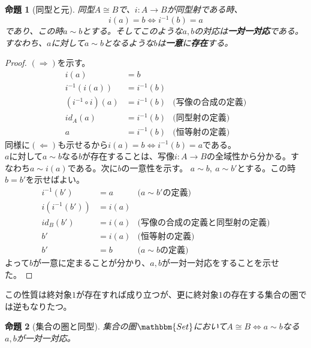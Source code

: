 \documentclass[uplatex,dvipdfmx]{jsarticle}
\newcommand{\cat}[1]{\mathbbm{#1}}
\newcommand{\arrow}{\rightarrow}
\newcommand{\mor}[3]{#1:#2\arrow #3}
\newtheorem{proof}{証明}[section]
\newtheorem{prop}[proof]{命題}
\numberwithin{proof}{subsection}
\begin{document}
  \begin{prop}[同型と元]
    同型$A\cong B$で、$\mor{i}{A}{B}$が同型射である時、
    \[i(a)=b\iff i^{-1}(b)=a\]であり、この時$a\sim b$とする。そしてこのような$a,b$の対応は\textbf{一対一対応}である。\\
    すなわち、$a$に対して$a\sim b$となるような$b$は\textbf{一意}に\textbf{存在}する。
    \begin{center}
    \end{center} 
  \end{prop}
  \begin{proof}
    $(\Longrightarrow)$を示す。
    \begin{align*}
      i(a)&=b\\
      i^{-1}(i(a))&=i^{-1}(b)\\
      (i^{-1}\circ i)(a)&=i^{-1}(b)&\text{(写像の合成の定義)}\\
      id_A(a)&=i^{-1}(b)&\text{(同型射の定義)}\\
      a &=i^{-1}(b)&\text{(恒等射の定義)}
    \end{align*}
    同様に$(\Longleftarrow)$も示せるから$i(a)=b\iff i^{-1}(b)=a$である。\\
    $a$に対して$a\sim b$なる$b$が存在することは、写像$\mor{i}{A}{B}$の全域性から分かる。すなわち$a\sim i(a)$である。次に$b$の一意性を示す。
    $a\sim b,\ a\sim b'$とする。この時$b=b'$を示せばよい。
    \begin{align*}
      i^{-1}(b')&=a&\text{($a\sim b'$の定義)}\\
      i(i^{-1}(b'))&=i(a)\\
      id_B(b')&=i(a)&\text{(写像の合成の定義と同型射の定義)}\\
      b'&=i(a)&\text{(恒等射の定義)}\\
      b'&=b&\text{($a\sim b$の定義)}
    \end{align*}
    よって$b$が一意に定まることが分かり、$a,b$が一対一対応をすることを示せた。
  \end{proof}
  この性質は終対象$1$が存在すれば成り立つが、更に終対象$1$の存在する集合の圏では逆もなりたつ。
  \begin{prop}[集合の圏と同型]
    集合の圏$\cat{Set}$において$A\cong B\iff a\sim b$なる$a,b$が一対一対応。
  \end{prop}  
\end{document}
